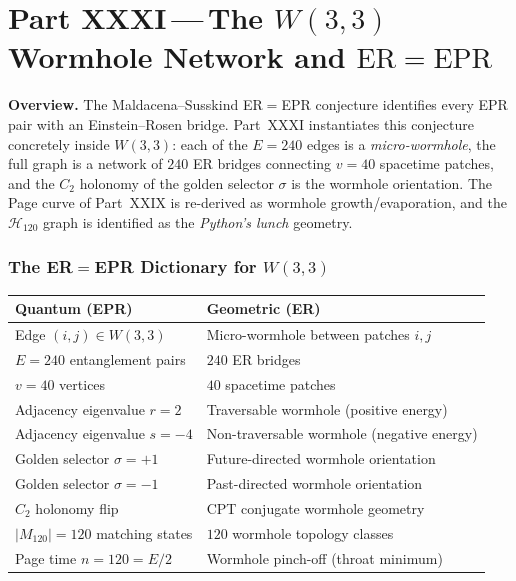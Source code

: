 
\part*{Part XXXI\,---\,The $W(3,3)$ Wormhole Network
       and $\mathrm{ER}=\mathrm{EPR}$}

\bigskip
\noindent\textbf{Overview.}\;
The Maldacena--Susskind ER$=$EPR conjecture identifies every EPR
pair with an Einstein--Rosen bridge.
Part~XXXI instantiates this conjecture concretely inside $W(3,3)$:
each of the $E=240$ edges is a \emph{micro-wormhole},
the full graph is a network of $240$ ER bridges
connecting $v=40$ spacetime patches,
and the $C_2$ holonomy of the golden selector $\sigma$
is the wormhole orientation.  The Page curve of
Part~XXIX is re-derived as wormhole growth/evaporation,
and the $\mathcal{H}_{120}$ graph is identified as
the \emph{Python's lunch} geometry.

\section{\texorpdfstring{The ER$=$EPR Dictionary for $W(3,3)$}{The ER=EPR Dictionary for W(3,3)}}
\label{sec:er_epr_dict}

\begin{definition}[$W(3,3)$ ER$=$EPR dictionary]
\label{def:er_epr}
\begin{center}
\begin{tabular}{ll}
  \hline
  \textbf{Quantum (EPR)} & \textbf{Geometric (ER)} \\
  \hline
  Edge $(i,j)\in W(3,3)$ & Micro-wormhole between patches $i,j$ \\
  $E=240$ entanglement pairs & $240$ ER bridges \\
  $v=40$ vertices & $40$ spacetime patches \\
  Adjacency eigenvalue $r=2$ & Traversable wormhole (positive energy) \\
  Adjacency eigenvalue $s=-4$ & Non-traversable wormhole (negative energy) \\
  Golden selector $\sigma=+1$ & Future-directed wormhole orientation \\
  Golden selector $\sigma=-1$ & Past-directed wormhole orientation \\
  $C_2$ holonomy flip & CPT conjugate wormhole geometry \\
  $|M_{120}|=120$ matching states & $120$ wormhole topology classes \\
  Page time $n=120=E/2$ & Wormhole pinch-off (throat minimum) \\
  \hline
\end{tabular}
\end{center}
\end{definition}

